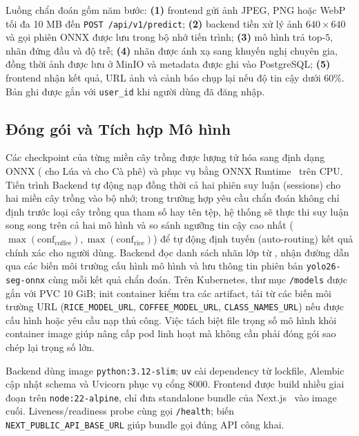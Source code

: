Luồng chẩn đoán gồm năm bước: \textbf{(1)} frontend gửi ảnh JPEG, PNG hoặc WebP tối đa 10 MB đến \texttt{POST /api/v1/predict}; \textbf{(2)} backend tiền xử lý ảnh $640\times640$ và gọi phiên ONNX được lưu trong bộ nhớ tiến trình; \textbf{(3)} mô hình trả top-$5$, nhãn đứng đầu và độ trễ; \textbf{(4)} nhãn được ánh xạ sang khuyến nghị chuyên gia, đồng thời ảnh được lưu ở MinIO và metadata được ghi vào PostgreSQL; \textbf{(5)} frontend nhận kết quả, URL ảnh và cảnh báo chụp lại nếu độ tin cậy dưới 60\%. Bản ghi được gắn với \texttt{user\_id} khi người dùng đã đăng nhập.

\subsection{Đóng gói và Tích hợp Mô hình}

Các checkpoint của từng miền cây trồng được lượng tử hóa sang định dạng ONNX ( cho Lúa và  cho Cà phê) và phục vụ bằng ONNX Runtime~\cite{onnxruntime2026} trên CPU. Tiến trình Backend tự động nạp đồng thời cả hai phiên suy luận (sessions) cho hai miền cây trồng vào bộ nhớ; trong trường hợp yêu cầu chẩn đoán không chỉ định trước loại cây trồng qua tham số hay tên tệp, hệ thống sẽ thực thi suy luận song song trên cả hai mô hình và so sánh ngưỡng tin cậy cao nhất ($\max(\text{conf}_{\text{coffee}}), \max(\text{conf}_{\text{rice}})$) để tự động định tuyến (auto-routing) kết quả chính xác cho người dùng. Backend đọc danh sách nhãn lớp từ , nhận đường dẫn qua các biến môi trường cấu hình mô hình và lưu thông tin phiên bản \texttt{yolo26-seg-onnx} cùng mỗi kết quả chẩn đoán. Trên Kubernetes, thư mục \texttt{/models} được gắn với PVC 10 GiB; init container kiểm tra các artifact, tải từ các biến môi trường URL (\texttt{RICE\_MODEL\_URL}, \texttt{COFFEE\_MODEL\_URL}, \texttt{CLASS\_NAMES\_URL}) nếu được cấu hình hoặc yêu cầu nạp thủ công. Việc tách biệt file trọng số mô hình khỏi container image giúp nâng cấp pod linh hoạt mà không cần phải đóng gói sao chép lại trọng số lớn.

Backend dùng image \texttt{python:3.12-slim}; \texttt{uv} cài dependency từ lockfile, Alembic cập nhật schema và Uvicorn phục vụ cổng 8000. Frontend được build nhiều giai đoạn trên \texttt{node:22-alpine}, chỉ đưa standalone bundle của Next.js~\cite{nextjs2026} vào image cuối. Liveness/readiness probe cùng gọi \texttt{/health}; biến \texttt{NEXT\_PUBLIC\_API\_BASE\_URL} giúp bundle gọi đúng API công khai.


